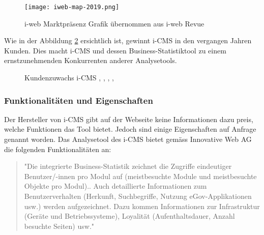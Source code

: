 \begin{figure}[h]
  \centering
  \texttt{[image: iweb-map-2019.png]}
  \caption{i-web Marktpräsenz Grafik übernommen aus i-web Revue \parencite[S. 14]{iweb2019revue}}
  \label{fig: iwebmap2019}
\end{figure}

\newpage

Wie in der Abbildung \ref{fig:icmszuwachs} ersichtlich ist, gewinnt i-CMS in den vergangen Jahren Kunden. Dies macht i-CMS und dessen Business-Statistiktool zu einem ernstzunehmenden Konkurrenten anderer Analysetools.  

\begin{figure}[h]
  \centering
  \caption{Kundenzuwachs i-CMS \parencite[S.7]{iweb2015revue}, \parencite[S. 7]{iweb2016revue}, \parencite[S. 7]{iweb2017revue}, \parencite[S. 14]{iweb2018revue}, \parencite[S. 14]{iweb2019revue}}
  \label{fig:icmszuwachs}
\end{figure}

\subsubsection{Funktionalitäten und Eigenschaften}
Der Hersteller von i-CMS gibt auf der Webseite keine Informationen dazu preis, welche Funktionen das Tool bietet. Jedoch sind einige Eigenschaften auf Anfrage genannt worden. Das Analysetool des i-CMS bietet gemäss Innovative Web AG \parencite{email} die folgenden Funktionalitäten an:

\begin{quote}
  "Die integrierte Business-Statistik zeichnet die Zugriffe eindeutiger Benutzer/-innen pro Modul auf (meistbesuchte Module und meistbesuchte Objekte pro Modul).. Auch detaillierte Informationen zum Benutzerverhalten (Herkunft, Suchbegriffe, Nutzung eGov-Applikationen usw.) werden aufgezeichnet. Dazu kommen Informationen zur Infrastruktur (Geräte und Betriebssysteme), Loyalität (Aufenthaltsdauer, Anzahl besuchte Seiten) usw."
\end{quote}

